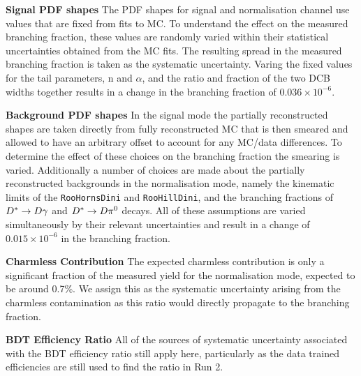 {\color{Blue}
\begin{description}
\item \textbf{Signal PDF shapes} The PDF shapes for signal and normalisation channel use values that are fixed from fits to MC. To understand the effect on the measured branching fraction, these values are randomly varied within their statistical uncertainties obtained from the MC fits. The resulting spread in the measured branching fraction is taken as the systematic uncertainty. Varing the fixed values for the tail parameters, n and $\alpha$, and the ratio and fraction of the two DCB widths together results in a change in the branching fraction of $0.036\times 10^{-6}$.

\item \textbf{Background PDF shapes} In the signal mode the partially reconstructed shapes are taken directly from fully reconstructed MC that is then smeared and allowed to have an arbitrary offset to account for any MC/data differences. To determine the effect of these choices on the branching fraction the smearing is varied. Additionally a number of choices are made about the partially reconstructed backgrounds in the normalisation mode, namely the kinematic limits of the \texttt{RooHornsDini} and \texttt{RooHillDini}, and the branching fractions of ${D}^{*} \rightarrow {\ensuremath{D}} \gamma $ and ${D}^{*} \rightarrow {\ensuremath{D}} \pi^{0} $ decays. All of these assumptions are varied simultaneously by their relevant uncertainties and result in a change of $0.015\times10^{-6}$ in the branching fraction.

\item \textbf{Charmless Contribution} The expected charmless contribution is only a significant fraction of the measured yield for the normalisation mode, expected to be around 0.7\%. We assign this as the systematic uncertainty arising from the charmless contamination as this ratio would directly propagate to the branching fraction.

\item \textbf{BDT Efficiency Ratio} All of the sources of systematic uncertainty associated with the BDT efficiency ratio still apply here, particularly as the data trained efficiencies are still used to find the ratio in Run 2. 


\end{description}}
